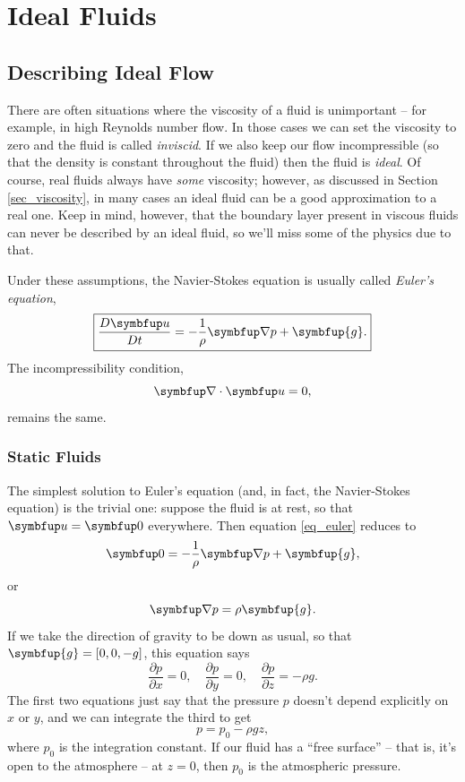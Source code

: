 \chapter{Ideal Fluids}

\section{Describing Ideal Flow}

There are often situations where the viscosity of a fluid is unimportant -- for example, in high Reynolds number flow.  In those cases we can set the viscosity to zero and the fluid is called \emph{inviscid}.  If we also keep our flow incompressible (so that the density is constant throughout the fluid) then the fluid is \emph{ideal}.  Of course, real fluids always have \emph{some} viscosity; however, as discussed in Section \ref{sec_viscosity}, in many cases an ideal fluid can be a good approximation to a real one.  Keep in mind, however, that the boundary layer present in viscous fluids can never be described by an ideal fluid, so we'll miss some of the physics due to that.

Under these assumptions, the Navier-Stokes equation is usually called \emph{Euler's equation},
\begin{equation}
\label{eq_euler}
\boxed{
\frac{D \uu}{Dt} = -\frac{1}{\rho} \grad p + \symbfup{g}.
}
\end{equation}
The incompressibility condition,
\begin{equation}
\grad \cdot \uu = 0,
\end{equation}
remains the same.



\subsection{Static Fluids}
\label{sec_static}

The simplest solution to Euler's equation (and, in fact, the Navier-Stokes equation) is the trivial one:  suppose the fluid is at rest, so that $\uu = \vec{0}$ everywhere.  Then equation \ref{eq_euler} reduces to 
\[
\vec{0} = -\frac{1}{\rho} \grad p + \symbfup{g},
\]
or 
\[
\grad p = \rho \symbfup{g}.
\]
If we take the direction of gravity to be down as usual, so that $\symbfup{g} = [0,0,-g]$, this equation says
\[
\frac{\partial p}{\partial x} = 0, \quad \frac{\partial p}{\partial y} = 0, \quad \frac{\partial p}{\partial z} = -\rho g.
\]
The first two equations just say that the pressure $p$ doesn't depend explicitly on $x$ or $y$, and we can integrate the third to get
\begin{equation}
p = p_0 - \rho g z,
\end{equation}
where $p_0$ is the integration constant.  If our fluid has a ``free surface'' -- that is, it's open to the atmosphere -- at $z=0$, then $p_0$ is the atmospheric pressure.


